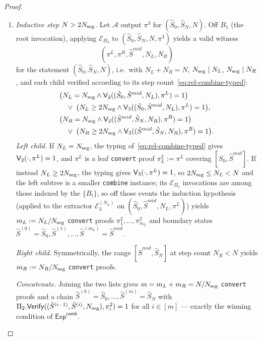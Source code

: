 \begin{proof}
\begin{enumerate}[label=\textbf{Step~\arabic*.},leftmargin=*,itemsep=5pt]
\begin{enumerate}[label=(\alph*),leftmargin=*,topsep=3pt]
  \item \emph{Inductive step $N>2N_{\mathrm{seg}}$.}
    Let $\mathcal{A}$ output $\pi^3$ for $(\hat{S}_0,\hat{S}_N,N)$. Off
    $B_1$ (the root invocation), applying $\mathcal{E}_{\Pi_3}$ to
    $(\hat{S}_0,\hat{S}_N,N,\pi^3)$ yields a valid witness
    \[
      (\pi^L,\pi^R,\hat{S}^{mid},N_L,N_R)
    \]
    for the statement $(\hat{S}_0,\hat{S}_N,N)$, i.e.\ with $N_L+N_R=N$,
    $N_{\mathrm{seg}}\mid N_L$, $N_{\mathrm{seg}}\mid N_R$, and each child verified according
    to its step count~\eqref{eq:rel-combine-typed}:
    \begin{align*}
      &\bigl(N_L=N_{\mathrm{seg}}\wedge\mathsf{V}_2((\hat{S}_0,\hat{S}^{mid},N_L),\pi^L)=1\bigr)\\
      &\quad\lor\;
       \bigl(N_L\ge 2N_{\mathrm{seg}}\wedge\mathsf{V}_3((\hat{S}_0,\hat{S}^{mid},N_L),\pi^L)=1\bigr), \\
      &\bigl(N_R=N_{\mathrm{seg}}\wedge\mathsf{V}_2((\hat{S}^{mid},\hat{S}_N,N_R),\pi^R)=1\bigr)\\
      &\quad\lor\;
       \bigl(N_R\ge 2N_{\mathrm{seg}}\wedge\mathsf{V}_3((\hat{S}^{mid},\hat{S}_N,N_R),\pi^R)=1\bigr).
    \end{align*}
    \emph{Left child.} If $N_L=N_{\mathrm{seg}}$, the typing
    of~\eqref{eq:rel-combine-typed} gives $\mathsf{V}_2(\cdot,\pi^L)=1$, and $\pi^L$
    is a leaf \texttt{convert} proof $\pi^2_L:=\pi^L$ covering
    $[\hat{S}_0,\hat{S}^{mid}]$. If instead $N_L\ge 2N_{\mathrm{seg}}$, the typing
    gives $\mathsf{V}_3(\cdot,\pi^L)=1$, so $2N_{\mathrm{seg}}\le N_L<N$ and the left
    subtree is a smaller \texttt{combine} instance; its $\mathcal{E}_{\Pi_3}$
    invocations are among those indexed by the $\{B_t\}$,
    so off those events the induction hypothesis (applied to the extractor
    $\mathcal{E}_3^{(N_L)}$ on $(\hat{S}_0,\hat{S}^{mid},N_L,\pi^L)$) yields
    $m_L:=N_L/N_{\mathrm{seg}}$ \texttt{convert} proofs $\pi^2_1,\ldots,\pi^2_{m_L}$ and
    boundary states
    $\hat{S}^{(0)}=\hat{S}_0,\hat{S}^{(1)},\ldots,\hat{S}^{(m_L)}=\hat{S}^{mid}$.

    \emph{Right child.} Symmetrically, the range $[\hat{S}^{mid},\hat{S}_N]$ at
    step count $N_R<N$ yields $m_R:=N_R/N_{\mathrm{seg}}$ \texttt{convert} proofs.

    \emph{Concatenate.} Joining the two lists gives $m=m_L+m_R=N/N_{\mathrm{seg}}$
    \texttt{convert} proofs and a chain
    $\hat{S}^{(0)}=\hat{S}_0,\ldots,\hat{S}^{(m)}=\hat{S}_N$ with
    $\Pi_2.\mathsf{Verify}((\hat{S}^{(i-1)},\hat{S}^{(i)},N_{\mathrm{seg}}),\pi^2_i)=1$
    for all $i\in[m]$ --- exactly the winning condition of
    $\mathsf{Exp}^{\mathsf{comb}}$.
  \end{enumerate}


\end{enumerate}
\end{proof}

